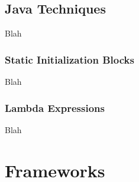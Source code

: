 
\subsection{Java Techniques}

Blah

\subsubsection{Static Initialization Blocks}

Blah

\subsubsection{Lambda Expressions}


Blah \\


\toclineskip
\section{Frameworks}
